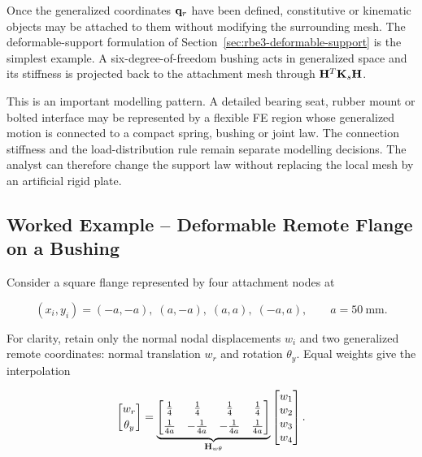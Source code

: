 Once the generalized coordinates $\mathbf{q}_r$ have been defined, constitutive or
kinematic objects may be attached to them without modifying the surrounding mesh.
The deformable-support formulation of Section~\ref{sec:rbe3-deformable-support}
is the simplest example. A six-degree-of-freedom bushing acts in generalized
space and its stiffness is projected back to the attachment mesh through
$\mathbf{H}^T\mathbf{K}_s\mathbf{H}$.

This is an important modelling pattern. A detailed bearing seat, rubber mount or
bolted interface may be represented by a flexible FE region whose generalized
motion is connected to a compact spring, bushing or joint law. The connection
stiffness and the load-distribution rule remain separate modelling decisions.
The analyst can therefore change the support law without replacing the local
mesh by an artificial rigid plate.

\subsection{Worked Example -- Deformable Remote Flange on a Bushing}

Consider a square flange represented by four attachment nodes at

\begin{equation}
    (x_i,y_i)
    =(-a,-a),\;(a,-a),\;(a,a),\;(-a,a),
    \qquad a=50~\mathrm{mm}.
\end{equation}

For clarity, retain only the normal nodal displacements $w_i$ and two generalized
remote coordinates: normal translation $w_r$ and rotation $\theta_y$. Equal
weights give the interpolation

\begin{equation}
\begin{bmatrix}
    w_r\\[2pt]\theta_y
\end{bmatrix}
=
\underbrace{
\begin{bmatrix}
    \tfrac14&\tfrac14&\tfrac14&\tfrac14\\[4pt]
    \tfrac{1}{4a}&-\tfrac{1}{4a}&-\tfrac{1}{4a}&\tfrac{1}{4a}
\end{bmatrix}}_{\mathbf{H}_{w\theta}}
\begin{bmatrix}
    w_1\\w_2\\w_3\\w_4
\end{bmatrix}.
\label{remote-flange-H}
\end{equation}

